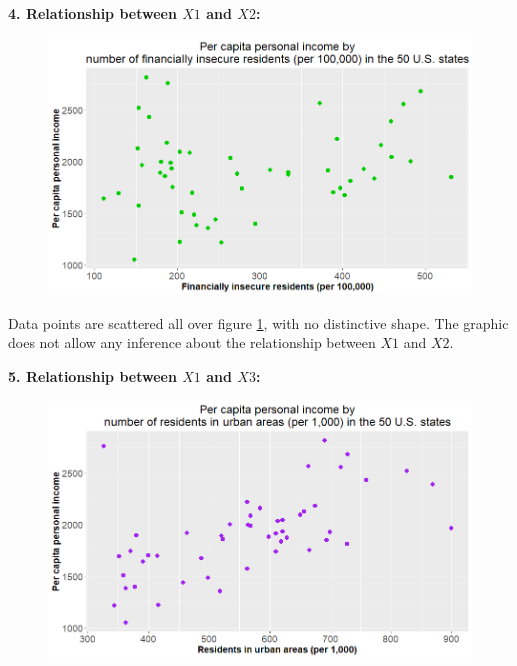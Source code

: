 \documentclass[12pt,letterpaper]{article}
\begin{document}
\begin{itemize}
		\newpage
		
		\textbf{4. Relationship between $X1$ and $X2$:}

		\vspace{.5cm}

		

		\begin{figure}[H]
			\centering
			\caption{}
			\label{x1x2}
			\includegraphics[width=0.9\linewidth]{Rplot4}
		\end{figure}
		
		Data points are scattered all over figure \ref{x1x2}, with no distinctive shape. The graphic does not allow any inference about the relationship between $X1$ and $X2$.\\
		
		\newpage
		
		\textbf{5. Relationship between $X1$ and $X3$:}

		\vspace{.5cm}		

		

		\begin{figure}[H]
			\centering
			\caption{}
			\label{x1x3}
			\includegraphics[width=0.9\linewidth]{Rplot5}
		\end{figure}
		

\end{itemize}
\end{document}
